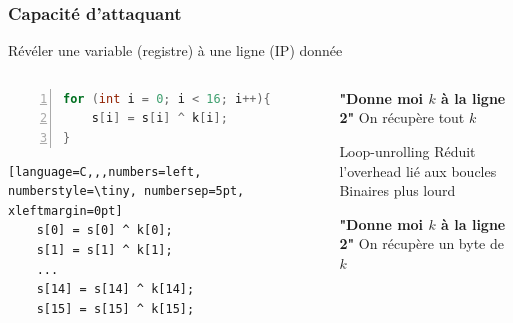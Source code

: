\begin{frame}[fragile]
\frametitle{Capacité d'attaquant}

\begin{center}
    Révéler une variable (registre) à une ligne  (IP) donnée
\end{center}

    \begin{columns}[c]

\begin{small}
\renewcommand{\lstlistingname}{}

\begin{lstlisting}[language=C,numbers=left, numberstyle=\tiny, numbersep=5pt, xleftmargin=0pt]
for (int i = 0; i < 16; i++){
    s[i] = s[i] ^ k[i];
}
\end{lstlisting}

\vspace{1cm}

\begin{lstlisting}[language=C,,,numbers=left, numberstyle=\tiny, numbersep=5pt, xleftmargin=0pt]
    s[0] = s[0] ^ k[0];
    s[1] = s[1] ^ k[1];
    ...
    s[14] = s[14] ^ k[14];
    s[15] = s[15] ^ k[15];

\end{lstlisting}

\end{small}

           \begin{outline}
                \1 \textbf{"Donne moi $k$ à la ligne 2"}
                    \2 On récupère tout $k$

                \vspace{0.45cm}
                \pause
                
                \1 Loop-unrolling
                    \2 Réduit l'overhead lié aux boucles
                    \2 Binaires plus lourd

                \vspace{0.5cm}
                \pause
                
                \1 \textbf{"Donne moi $k$ à la ligne 2"}
                    \2 On récupère un byte de $k$
            \end{outline}
            \vspace{0.6cm}
            
    \end{columns}

\end{frame}


